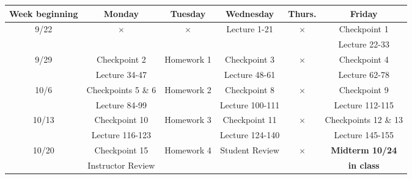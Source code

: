 \documentclass[10pt]{article}
\begin{document}
\begin{tabular}{c|c|c|c|c|c}
\hline
Week beginning & Monday & Tuesday & Wednesday & Thurs. & Friday \\
\hline
9/22  & $\times$ & $\times$ & Lecture 1-21 & $\times$ &  Checkpoint 1 \\
      &          &          &              &  &  Lecture 22-33       \\
\hline 
9/29  & Checkpoint 2   & Homework 1  & Checkpoint 3   & $\times$ &  Checkpoint 4 \\
      & Lecture 34-47  &             & Lecture 48-61  &  &  Lecture 62-78   \\
\hline 
10/6  & Checkpoints 5 \& 6  & Homework 2  & Checkpoint 8   & $\times$ &   Checkpoint 9 \\
      & Lecture 84-99  &              & Lecture 100-111 &  &   Lecture 112-115  \\
\hline 
10/13  & Checkpoint 10  & Homework 3  & Checkpoint 11   & $\times$ &  Checkpoints
12 \& 13 \\
      & Lecture 116-123 &             & Lecture 124-140 &  &   Lecture 145-155  \\
\hline 
10/20  & Checkpoint 15      & Homework 4  & Student Review  & $\times$ &  {\bfseries Midterm 10/24}  \\
       & Instructor Review  &             &                 &  &
{\bfseries in class }          \\
\hline 


\end{tabular}
\end{document}
